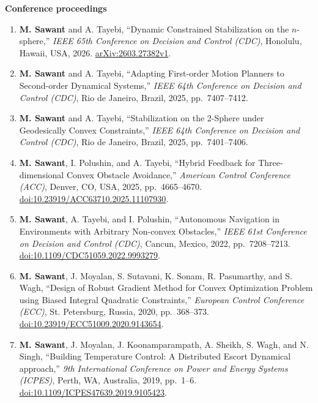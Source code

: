 \documentclass[10pt]{article}
\newcommand{\DOI}[1]{\href{https://doi.org/#1}{doi:#1}}
\begin{document}
\textbf{Conference proceedings}
\begin{enumerate}
  \item \textbf{M. Sawant} and A. Tayebi, ``Dynamic Constrained Stabilization on the $n$-sphere,'' \textit{IEEE 65th Conference on Decision and Control (CDC)}, Honolulu, Hawaii, USA, 2026. \href{https://arxiv.org/abs/2603.27382v1}{arXiv:2603.27382v1}.
  \item \textbf{M. Sawant} and A. Tayebi, ``Adapting First-order Motion Planners to Second-order Dynamical Systems,'' \textit{IEEE 64th Conference on Decision and Control (CDC)}, Rio de Janeiro, Brazil, 2025, pp.~7407--7412.
  \item \textbf{M. Sawant} and A. Tayebi, ``Stabilization on the 2-Sphere under Geodesically Convex Constraints,'' \textit{IEEE 64th Conference on Decision and Control (CDC)}, Rio de Janeiro, Brazil, 2025, pp.~7401--7406.
  \item \textbf{M. Sawant}, I. Polushin, and A. Tayebi, ``Hybrid Feedback for Three-dimensional Convex Obstacle Avoidance,'' \textit{American Control Conference (ACC)}, Denver, CO, USA, 2025, pp.~4665--4670. \\\DOI{10.23919/ACC63710.2025.11107930}.
  \item \textbf{M. Sawant}, A. Tayebi, and I. Polushin, ``Autonomous Navigation in Environments with Arbitrary Non-convex Obstacles,'' \textit{IEEE 61st Conference on Decision and Control (CDC)}, Cancun, Mexico, 2022, pp.~7208--7213. \DOI{10.1109/CDC51059.2022.9993279}.
  \item \textbf{M. Sawant}, J. Moyalan, S. Sutavani, K. Sonam, R. Pasumarthy, and S. Wagh, ``Design of Robust Gradient Method for Convex Optimization Problem using Biased Integral Quadratic Constraints,'' \textit{European Control Conference (ECC)}, St. Petersburg, Russia, 2020, pp.~368--373. \DOI{10.23919/ECC51009.2020.9143654}.
  \item \textbf{M. Sawant}, J. Moyalan, J. Koonamparampath, A. Sheikh, S. Wagh, and N. Singh, ``Building Temperature Control: A Distributed Escort Dynamical approach,'' \textit{9th International Conference on Power and Energy Systems (ICPES)}, Perth, WA, Australia, 2019, pp.~1--6. \DOI{10.1109/ICPES47639.2019.9105423}.

\end{enumerate}
\end{document}
